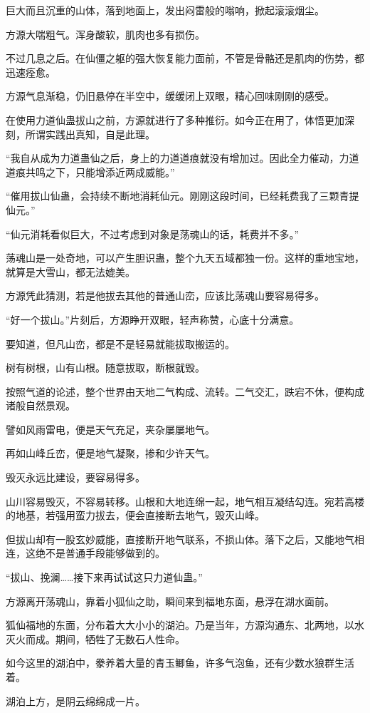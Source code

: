 \begin{this_body}
巨大而且沉重的山体，落到地面上，发出闷雷般的嗡响，掀起滚滚烟尘。

方源大喘粗气。浑身酸软，肌肉也多有损伤。

不过几息之后。在仙僵之躯的强大恢复能力面前，不管是骨骼还是肌肉的伤势，都迅速痊愈。

方源气息渐稳，仍旧悬停在半空中，缓缓闭上双眼，精心回味刚刚的感受。

在使用力道仙蛊拔山之前，方源就进行了多种推衍。如今正在用了，体悟更加深刻，所谓实践出真知，自是此理。

“我自从成为力道蛊仙之后，身上的力道道痕就没有增加过。因此全力催动，力道道痕共鸣之下，只能增添近两成威能。”

“催用拔山仙蛊，会持续不断地消耗仙元。刚刚这段时间，已经耗费我了三颗青提仙元。”

“仙元消耗看似巨大，不过考虑到对象是荡魂山的话，耗费并不多。”

荡魂山是一处奇地，可以产生胆识蛊，整个九天五域都独一份。这样的重地宝地，就算是大雪山，都无法媲美。

方源凭此猜测，若是他拔去其他的普通山峦，应该比荡魂山要容易得多。

“好一个拔山。”片刻后，方源睁开双眼，轻声称赞，心底十分满意。

要知道，但凡山峦，都是不是轻易就能拔取搬运的。

树有树根，山有山根。随意拔取，断根就毁。

按照气道的论述，整个世界由天地二气构成、流转。二气交汇，跌宕不休，便构成诸般自然景观。

譬如风雨雷电，便是天气充足，夹杂屡屡地气。

再如山峰丘峦，便是地气凝聚，掺和少许天气。

毁灭永远比建设，要容易得多。

山川容易毁灭，不容易转移。山根和大地连绵一起，地气相互凝结勾连。宛若高楼的地基，若强用蛮力拔去，便会直接断去地气，毁灭山峰。

但拔山却有一股玄妙威能，直接断开地气联系，不损山体。落下之后，又能地气相连，这绝不是普通手段能够做到的。

“拔山、挽澜……接下来再试试这只力道仙蛊。”

方源离开荡魂山，靠着小狐仙之助，瞬间来到福地东面，悬浮在湖水面前。

狐仙福地的东面，分布着大大小小的湖泊。乃是当年，方源沟通东、北两地，以水灭火而成。期间，牺牲了无数石人性命。

如今这里的湖泊中，豢养着大量的青玉鲫鱼，许多气泡鱼，还有少数水狼群生活着。

湖泊上方，是阴云绵绵成一片。


\end{this_body}
